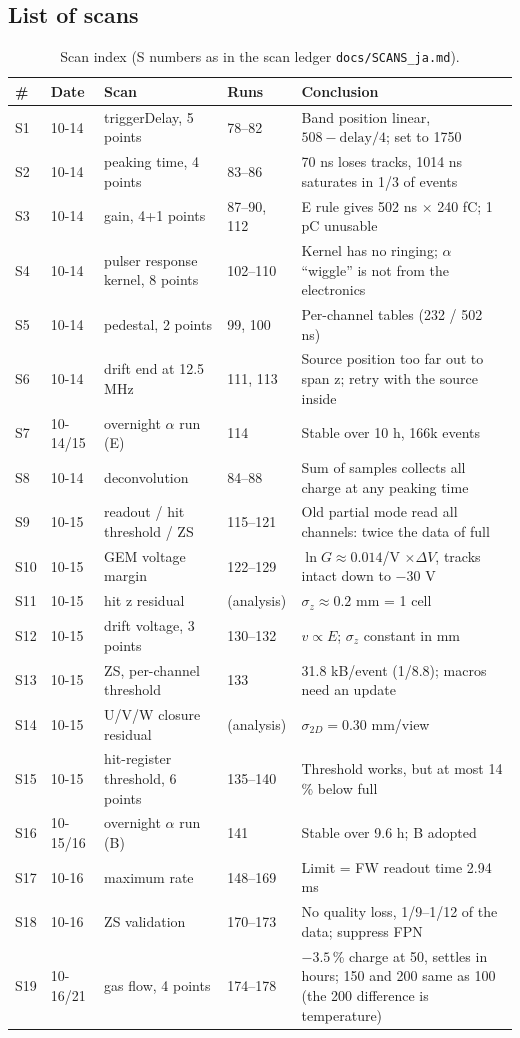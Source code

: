 \documentclass[a4paper,11pt]{article}
\begin{document}
\subsection{List of scans}
\begin{table}[H]\centering\small
\caption{Scan index (S numbers as in the scan ledger \texttt{docs/SCANS\_ja.md}).}
\begin{tabular}{llllp{70mm}}
\toprule
\# & Date & Scan & Runs & Conclusion \\
\midrule
S1 & 10-14 & triggerDelay, 5 points & 78--82 & Band position linear, $508 - \mathrm{delay}/4$; set to 1750 \\
S2 & 10-14 & peaking time, 4 points & 83--86 & 70 ns loses tracks, 1014 ns saturates in 1/3 of events \\
S3 & 10-14 & gain, 4+1 points & 87--90, 112 & E rule gives 502 ns $\times$ 240 fC; 1 pC unusable \\
S4 & 10-14 & pulser response kernel, 8 points & 102--110 & Kernel has no ringing; $\alpha$ ``wiggle'' is not from the electronics \\
S5 & 10-14 & pedestal, 2 points & 99, 100 & Per-channel tables (232 / 502 ns) \\
S6 & 10-14 & drift end at 12.5 MHz & 111, 113 & Source position too far out to span z; retry with the source inside \\
S7 & 10-14/15 & overnight $\alpha$ run (E) & 114 & Stable over 10 h, 166k events \\
S8 & 10-14 & deconvolution & 84--88 & Sum of samples collects all charge at any peaking time \\
S9 & 10-15 & readout / hit threshold / ZS & 115--121 & Old partial mode read all channels: twice the data of full \\
S10 & 10-15 & GEM voltage margin & 122--129 & $\ln G \approx 0.014$/V $\times \Delta V$, tracks intact down to $-30$ V \\
S11 & 10-15 & hit z residual & (analysis) & $\sigma_z \approx 0.2$ mm = 1 cell \\
S12 & 10-15 & drift voltage, 3 points & 130--132 & $v \propto E$; $\sigma_z$ constant in mm \\
S13 & 10-15 & ZS, per-channel threshold & 133 & 31.8 kB/event (1/8.8); macros need an update \\
S14 & 10-15 & U/V/W closure residual & (analysis) & $\sigma_{2D} = 0.30$ mm/view \\
S15 & 10-15 & hit-register threshold, 6 points & 135--140 & Threshold works, but at most 14\,\% below full \\
S16 & 10-15/16 & overnight $\alpha$ run (B) & 141 & Stable over 9.6 h; B adopted \\
S17 & 10-16 & maximum rate & 148--169 & Limit = FW readout time 2.94 ms \\
S18 & 10-16 & ZS validation & 170--173 & No quality loss, 1/9--1/12 of the data; suppress FPN \\
S19 & 10-16/21 & gas flow, 4 points & 174--178 & $-3.5$\,\% charge at 50, settles in hours; 150 and 200 same as 100 (the 200 difference is temperature) \\
\bottomrule
\end{tabular}
\end{table}
\end{document}
